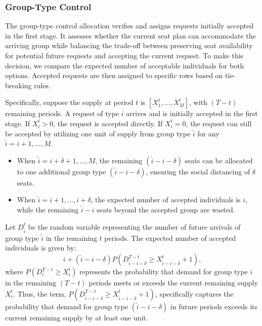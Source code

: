 
\subsubsection{Group-Type Control}\label{nested_policy}
The group-type control allocation verifies and assigns requests initially accepted in the first stage. It assesses whether the current seat plan can accommodate the arriving group while balancing the trade-off between preserving seat availability for potential future requests and accepting the current request. To make this decision, we compare the expected number of acceptable individuals for both options. Accepted requests are then assigned to specific rows based on tie-breaking rules.


Specifically, suppose the supply at period $t$ is $[X_1^{t}, \ldots, X_M^{t}]$, with $(T-t)$ remaining periods. A request of type $i$ arrives and is initially accepted in the first stage. If $X_{i}^{t} > 0$, the request is accepted directly. If $X_{i}^{t} = 0$, the request can still be accepted by utilizing one unit of supply from group type $\hat{i}$ for any $\hat{i}={i}+1, \ldots, M$. 
\begin{itemize}
  \item When $\hat{i} = {i}+\delta+1, \ldots, M$, the remaining $(\hat{i}-{i}-\delta)$ seats can be allocated to one additional group type $(\hat{i}-{i}-\delta)$, ensuring the social distancing of $\delta$ seats.
  \item When $\hat{i} = {i}+1, \ldots, i+\delta$, the expected number of accepted individuals is ${i}$, while the remaining $\hat{i}-{i}$ seats beyond the accepted group are wasted.
\end{itemize}

Let $D_{\hat{i}}^{t}$ be the random variable representing the number of future arrivals of group type $\hat{i}$ in the remaining $t$ periods. The expected number of accepted individuals is given by: $${i} + (\hat{i}-{i}-\delta)P(D_{\hat{i}-{i}-\delta}^{T-t} \geq X_{\hat{i}-{i}-\delta}^{t}+1),$$ where $P(D_{i}^{T-t} \geq X_{i}^{t})$ represents the probability that  demand for group type ${i}$ in the remaining $(T-t)$ periods meets or exceeds the current remaining supply $X_{i}^{t}$. Thus, the term, $P(D_{\hat{i}-{i}-\delta}^{T-t} \geq X_{\hat{i}-{i}-\delta}^{t}+1)$, specifically captures the probability that demand for group type $(\hat{i}-{i}-\delta)$ in future periods exceeds its current remaining supply by at least one unit.

